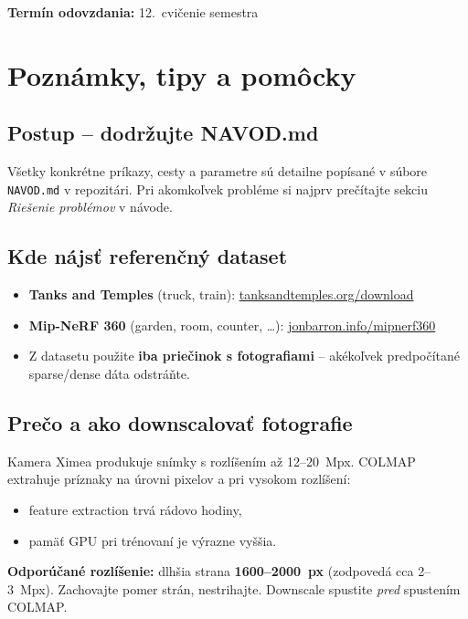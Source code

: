 \documentclass{article}
\begin{document}
\textbf{Termín odovzdania:} 12.\ cvičenie semestra

\newpage

\section*{Poznámky, tipy a pomôcky}

\subsection*{Postup – dodržujte NAVOD.md}

Všetky konkrétne príkazy, cesty a parametre sú detailne popísané v súbore
\texttt{NAVOD.md} v repozitári.
Pri akomkoľvek probléme si najprv prečítajte sekciu \emph{Riešenie problémov}
v návode.

\subsection*{Kde nájsť referenčný dataset}

\begin{itemize}
    \item \textbf{Tanks and Temples} (truck, train):
          \href{https://www.tanksandtemples.org/download/}{tanksandtemples.org/download}
    \item \textbf{Mip-NeRF 360} (garden, room, counter, \ldots):
          \href{https://jonbarron.info/mipnerf360/}{jonbarron.info/mipnerf360}
    \item Z datasetu použite \textbf{iba priečinok s fotografiami} –
          akékoľvek predpočítané sparse/dense dáta odstráňte.
\end{itemize}

\subsection*{Prečo a ako downscalovať fotografie}

Kamera Ximea produkuje snímky s rozlíšením až 12–20~Mpx.
COLMAP extrahuje príznaky na úrovni pixelov a pri vysokom rozlíšení:
\begin{itemize}
    \item feature extraction trvá rádovo hodiny,
    \item pamäť GPU pri trénovaní je výrazne vyššia.
\end{itemize}
\textbf{Odporúčané rozlíšenie:} dlhšia strana \textbf{1600–2000~px}
(zodpovedá cca 2–3~Mpx).
Zachovajte pomer strán, nestrihajte.
Downscale spustite \emph{pred} spustením COLMAP.
\end{document}
